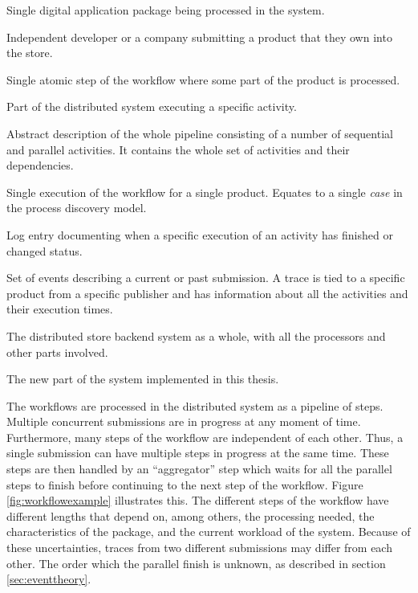 \begin{description}[style=nextline]
\item[Product] 
Single digital application package being processed in the system. 

\item[Publisher] 
Independent developer or a company submitting a product that they own into the store.

\item[Activity] 
Single atomic step of the workflow where some part of the product is processed. 

\item[Processor] 
Part of the distributed system executing a specific activity.

\item[Workflow]
Abstract description of the whole pipeline consisting of a number of sequential and parallel activities. It contains the whole set of activities and their dependencies.

\item[Submission] 
Single execution of the workflow for a single product. Equates to a single \emph{case} in the process discovery model.

\item[Event] 
Log entry documenting when a specific execution of an activity has finished or changed status. 

\item[Trace] 
Set of events describing a current or past submission. 
A trace is tied to a specific product from a specific publisher and has information about all the activities and their execution times. 

\item[System] 
The distributed store backend system as a whole, with all the processors and other parts involved.

\item[Project] 
The new part of the system implemented in this thesis.

\label{desc:termdefinitions}
\end{description}


The workflows are processed in the distributed system as a pipeline of steps. 
Multiple concurrent submissions are in progress at any moment of time.
Furthermore, many steps of the workflow are independent of each other.
Thus, a single submission can have multiple steps in progress at the same time.
These steps are then handled by an ``aggregator'' step which waits for 
all the parallel steps to finish before continuing to the next step of the workflow.
Figure \ref{fig:workflowexample} illustrates this.
The different steps of the workflow have different lengths that depend on, among others,
the processing needed, the characteristics of the package, and the current workload of the system.
Because of these uncertainties, traces from two different submissions may differ from each other.
The order which the parallel finish is unknown, as described in section \ref{sec:eventtheory}.

